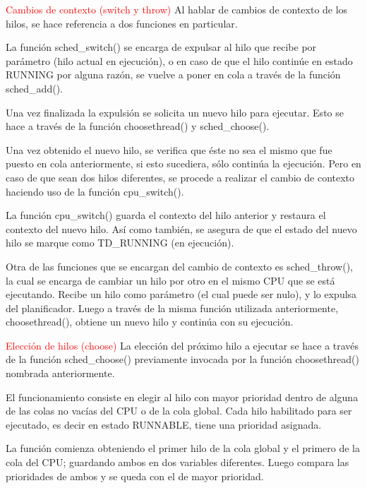 \textcolor{red}{Cambios de contexto (switch y throw)}
Al hablar de cambios de contexto de los hilos, se hace referencia a dos funciones en particular.\par

La función sched\_switch() se encarga de expulsar al hilo que recibe por parámetro (hilo actual en ejecución), o en caso de que el hilo continúe en estado RUNNING por alguna razón, se vuelve a poner en cola a través de la función sched\_add().\par

Una vez finalizada la expulsión se solicita un nuevo hilo para ejecutar. Esto se hace a través de la función choosethread() y sched\_choose().\par

Una vez obtenido el nuevo hilo, se verifica que éste no sea el mismo que fue puesto en cola anteriormente, si esto sucediera, sólo continúa la ejecución. Pero en caso de que sean dos hilos diferentes, se procede a realizar el cambio de contexto haciendo uso de la función cpu\_switch().\par

La función cpu\_switch() guarda el contexto del hilo anterior y restaura el contexto del nuevo hilo. Así como también, se asegura de que el estado del nuevo hilo se marque como TD\_RUNNING (en ejecución).\par

Otra de las funciones que se encargan del cambio de contexto es sched\_throw(), la cual se encarga de cambiar un hilo por otro en el mismo CPU que se está ejecutando. Recibe un hilo como parámetro (el cual puede ser nulo), y lo expulsa del planificador. Luego a través de la misma función utilizada anteriormente, choosethread(), obtiene un nuevo hilo y continúa con su ejecución.\par

\textcolor{red}{Elección de hilos (choose)}
La elección del próximo hilo a ejecutar se hace a través de la función sched\_choose() previamente invocada por la función choosethread() nombrada anteriormente.

El funcionamiento consiste en elegir al hilo con mayor prioridad dentro de alguna de las colas no vacías del CPU o de la cola global. Cada hilo habilitado para ser ejecutado, es decir en estado RUNNABLE, tiene una prioridad asignada.

La función comienza obteniendo el primer hilo de la cola global y el primero de la cola del CPU; guardando ambos en dos variables diferentes. Luego compara las prioridades de ambos y se queda con el de mayor prioridad.

